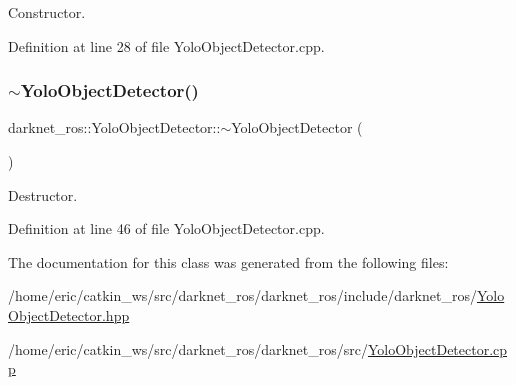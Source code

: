 Constructor. 

Definition at line 28 of file Yolo\+Object\+Detector.\+cpp.

\mbox{\label{classdarknet__ros_1_1YoloObjectDetector_a70876fdecf5363c35ed5d41d742f0cba}} 
\subsubsection{\texorpdfstring{$\sim$YoloObjectDetector()}{~YoloObjectDetector()}}
{\footnotesize\ttfamily darknet\+\_\+ros\+::\+Yolo\+Object\+Detector\+::$\sim$\+Yolo\+Object\+Detector (\begin{DoxyParamCaption}{ }\end{DoxyParamCaption})}

Destructor. 

Definition at line 46 of file Yolo\+Object\+Detector.\+cpp.



The documentation for this class was generated from the following files\+:\begin{DoxyCompactItemize}
\item 
/home/eric/catkin\+\_\+ws/src/darknet\+\_\+ros/darknet\+\_\+ros/include/darknet\+\_\+ros/\mbox{\hyperlink{YoloObjectDetector_8hpp}{Yolo\+Object\+Detector.\+hpp}}\item 
/home/eric/catkin\+\_\+ws/src/darknet\+\_\+ros/darknet\+\_\+ros/src/\mbox{\hyperlink{YoloObjectDetector_8cpp}{Yolo\+Object\+Detector.\+cpp}}\end{DoxyCompactItemize}
